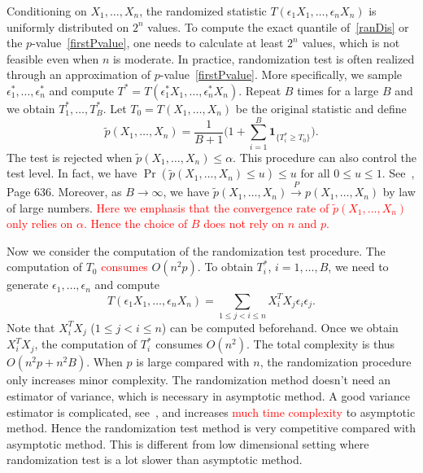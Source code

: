 \documentclass[review]{elsarticle}
\theoremstyle{plain}
\theoremstyle{definition}
\theoremstyle{remark}
\begin{document}
Conditioning on $X_1,\ldots, X_n$, the randomized statistic $T(\epsilon_1 X_1,\ldots,\epsilon_n X_n)$ is uniformly distributed on $2^n$ values.
To compute the exact quantile of~\eqref{ranDis} or the $p$-value~\eqref{firstPvalue}, one needs to calculate at least $2^n$ values, which is not feasible even when $n$ is moderate.
In practice, randomization test is often realized through an approximation of $p$-value~\eqref{firstPvalue}.
More specifically, we sample  $\epsilon_1^*,\ldots,\epsilon_n^*$ and compute $T^*=T(\epsilon_1^* X_1,\ldots,\epsilon_n^* X_n)$.
Repeat $B$ times for a large $B$ and we obtain $T_1^*,\ldots,T_B^*$.
Let $T_0=T(X_1,\ldots,X_n)$ be the original statistic and define
$$\tilde{p}(X_1,\ldots,X_n)=\frac{1}{B+1}\big(1+\sum_{i=1}^B \mathbf{1}_{\{T_i^*\geq T_0\}}\big).$$
The test is rejected when $\tilde{p}(X_1,\ldots,X_n)\leq \alpha$. This procedure can also control the test level.
In fact, we have
$\Pr(\tilde{p}(X_1,\ldots,X_n)\leq u)\leq u$ for all $0\leq u\leq 1$.
See~\cite{Lehmann}, Page $636$.
Moreover,  as $B\to \infty$, we have $\tilde{p}(X_1,\ldots,X_n)\xrightarrow{P}p(X_1,\ldots,X_n)$ by law of large numbers.
\textcolor{red}{Here we emphasis that the convergence rate of $\tilde{p}(X_1,\ldots,X_n)$ only relies on $\alpha$.
Hence the choice of $B$ does not rely on $n$ and $p$.}

Now we consider the computation of the randomization test procedure.
The computation of $T_0$ \textcolor{red}{consumes} $O(n^2 p)$.
To obtain $T_i^*$, $i=1,\ldots,B$, we need to generate $\epsilon_1,\ldots,\epsilon_n$ and compute
$$
T(\epsilon_1 X_1,\ldots,\epsilon_n X_n)
=\sum_{1\leq j<i \leq n}X_i^T X_j \epsilon_i \epsilon_j.
$$
Note that $X_i^T X_j$ ($1\leq j<i\leq n$) can be computed beforehand.
Once we obtain $X_i^T X_j$, the computation of $T_i^*$ consumes $O(n^2)$.
The total complexity is thus $O(n^2 p+n^2 B)$.
When $p$ is large compared with $n$, the randomization procedure only increases minor complexity.
The randomization method doesn't need an estimator of variance, which is necessary in asymptotic method. 
A good variance estimator is complicated, see~\cite{Chen2010A}, and increases \textcolor{red}{much time complexity} to asymptotic method.
Hence the randomization test method is very competitive compared with asymptotic method.
This is different from low dimensional setting where randomization test is a lot slower than asymptotic method.
\end{document}
